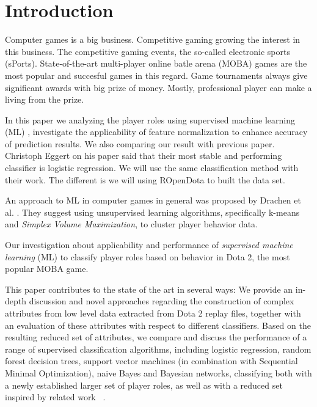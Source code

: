 \section{Introduction}

Computer games is a big business. Competitive gaming growing the interest in this business. The competitive gaming events, the so-called electronic sports (sPorts). State-of-the-art multi-player online batle arena (MOBA) games are the most popular and succesful games in this regard. Game tournaments always give significant awards with big prize of money. Mostly, professional player can make a living from the prize. 

In this paper we analyzing the player roles using supervised machine learning (ML) , investigate the applicability of feature normalization to enhance accuracy of prediction results. We also comparing our result with previous paper. Christoph Eggert on his paper said that their most stable and performing classifier is logistic regression. We will use the same classification method with their work. The different is we will using ROpenDota to built the data set.

An approach to ML in computer games in general was proposed by Drachen et al.\cite{drachen2014skill} . They suggest using unsupervised learning algorithms, specifically k-means and \textit{Simplex Volume Maximization}, to cluster player behavior data.

Our investigation about applicability and performance of \textit{supervised machine learning} (ML) to classify player roles based on behavior in Dota 2, the most popular MOBA game.

This paper contributes to the state of the art in several ways: We provide an in-depth discussion and novel approaches regarding the construction of complex attributes from low level data extracted from Dota 2 replay files, together with an evaluation of these attributes with respect to different classifiers. Based on the resulting reduced set of attributes, we compare and discuss the performance of a range of supervised classification algorithms, including logistic regression, random forest decision trees, support vector machines (in combination with Sequential Minimal Optimization), naive Bayes and Bayesian networks, classifying both with a newly established larger set of player roles, as well as with a reduced set inspired by related work ~\cite{eggert2015classification}.